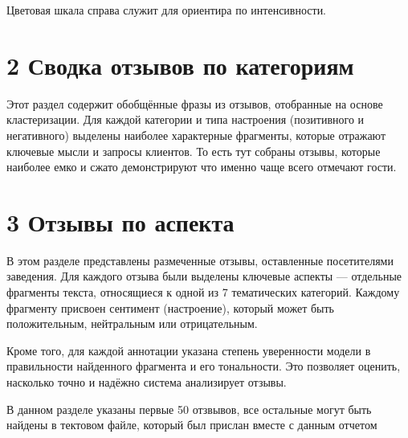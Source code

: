 \documentclass[a4paper,12pt]{extarticle}
\begin{document}
\noindent
Цветовая шкала справа служит для ориентира по интенсивности.


\section*{2 Сводка отзывов по категориям}
\vspace{1em}

Этот раздел содержит обобщённые фразы из отзывов, отобранные на основе кластеризации.
Для каждой категории и типа настроения (позитивного и негативного) выделены наиболее характерные фрагменты,
которые отражают ключевые мысли и запросы клиентов.
То есть тут собраны отзывы, которые наиболее емко и сжато демонстрируют что именно чаще всего отмечают гости.



\newpage
\section*{3 Отзывы по аспекта}

В этом разделе представлены размеченные отзывы, оставленные посетителями заведения. Для каждого отзыва были выделены ключевые аспекты — отдельные фрагменты текста, относящиеся к одной из 7 тематических категорий. Каждому фрагменту присвоен сентимент (настроение), который может быть положительным, нейтральным или отрицательным.

Кроме того, для каждой аннотации указана степень уверенности модели в правильности найденного фрагмента и его тональности. Это позволяет оценить, насколько точно и надёжно система анализирует отзывы.

В данном разделе указаны первые 50 отзвывов, все остальные могут быть найдены в тектовом файле, который был прислан вместе с данным отчетом


\end{document}
